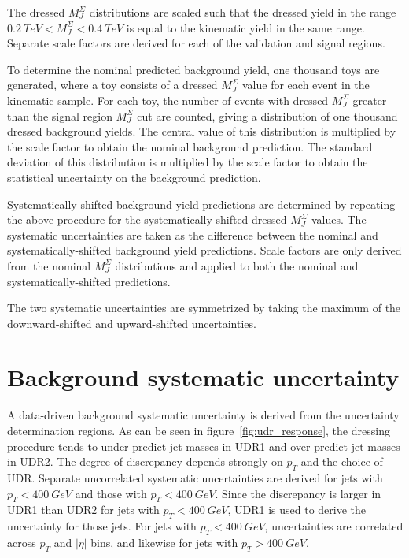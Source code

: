 The dressed $M_{J}^{\Sigma}$ distributions are scaled such that the dressed yield in the range  $0.2~TeV < M_{J}^{\Sigma} < 0.4~TeV$ is equal to the kinematic yield in the same range.
Separate scale factors are derived for each of the validation and signal regions.

To determine the nominal predicted background yield, one thousand toys are generated,
where a toy consists of a dressed $M_{J}^{\Sigma}$ value for each event in the kinematic sample.
For each toy, the number of events with dressed $M_{J}^{\Sigma}$ greater than the signal region $M_{J}^{\Sigma}$ cut are counted,
giving a distribution of one thousand dressed background yields.
The central value of this distribution is multiplied by the scale factor to obtain the nominal background prediction.
The standard deviation of this distribution is multiplied by the scale factor to obtain the statistical uncertainty on the background prediction.

Systematically-shifted background yield predictions are determined by repeating the above procedure for the systematically-shifted dressed $M_{J}^{\Sigma}$ values.
The systematic uncertainties are taken as the difference between the nominal and systematically-shifted background yield predictions.
Scale factors are only derived from the nominal $M_{J}^{\Sigma}$ distributions and applied to both the nominal and systematically-shifted predictions.

The two systematic uncertainties are symmetrized by taking the maximum of the \linebreak downward-shifted and upward-shifted uncertainties.

\section{Background systematic uncertainty} \label{sec:bkg_uncert}
A data-driven background systematic uncertainty is derived from the uncertainty determination regions.
As can be seen in figure~\ref{fig:udr_response}, the dressing procedure tends to under-predict jet masses in UDR1 and over-predict jet masses in UDR2.
The degree of discrepancy depends strongly on $p_T$ and the choice of UDR.
Separate uncorrelated systematic uncertainties are derived for jets with $p_T<400~GeV$ and those with $p_T<400~GeV$.
Since the discrepancy is larger in UDR1 than UDR2 for jets with $p_T<400~GeV$, UDR1 is used to derive the uncertainty for those jets.
For jets with $p_T<400~GeV$, uncertainties are correlated across $p_T$ and $|\eta|$ bins, and likewise for jets with $p_T>400~GeV$.

